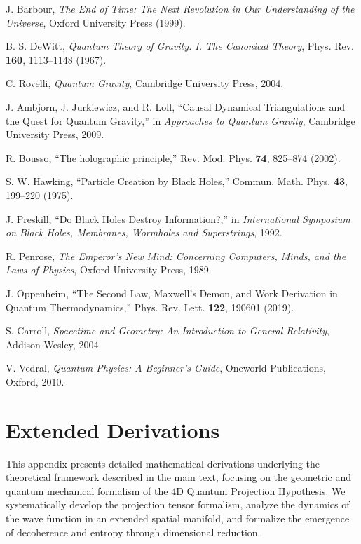 \documentclass[12pt,a4paper]{article}
\numberwithin{equation}{section}
\begin{document}
\begin{thebibliography}{99}
J. Barbour, \emph{The End of Time: The Next Revolution in Our Understanding of the Universe}, Oxford University Press (1999).

B. S. DeWitt, \emph{Quantum Theory of Gravity. I. The Canonical Theory}, Phys. Rev. \textbf{160}, 1113--1148 (1967).

C. Rovelli, \emph{Quantum Gravity}, Cambridge University Press, 2004.

J. Ambjorn, J. Jurkiewicz, and R. Loll, “Causal Dynamical Triangulations and the Quest for Quantum Gravity,” in \emph{Approaches to Quantum Gravity}, Cambridge University Press, 2009.

R. Bousso, “The holographic principle,” Rev. Mod. Phys. \textbf{74}, 825–874 (2002).

S. W. Hawking, “Particle Creation by Black Holes,” Commun. Math. Phys. \textbf{43}, 199–220 (1975).

J. Preskill, “Do Black Holes Destroy Information?,” in \emph{International Symposium on Black Holes, Membranes, Wormholes and Superstrings}, 1992.

R. Penrose, \emph{The Emperor's New Mind: Concerning Computers, Minds, and the Laws of Physics}, Oxford University Press, 1989.

J. Oppenheim, “The Second Law, Maxwell’s Demon, and Work Derivation in Quantum Thermodynamics,” Phys. Rev. Lett. \textbf{122}, 190601 (2019).

S. Carroll, \emph{Spacetime and Geometry: An Introduction to General Relativity}, Addison-Wesley, 2004.

V. Vedral, \emph{Quantum Physics: A Beginner's Guide}, Oneworld Publications, Oxford, 2010.


\end{thebibliography}
\newpage
\appendix
\section{Extended Derivations}
\label{app:extended_derivations}

This appendix presents detailed mathematical derivations underlying the theoretical framework described in the main text, focusing on the geometric and quantum mechanical formalism of the 4D Quantum Projection Hypothesis. We systematically develop the projection tensor formalism, analyze the dynamics of the wave function in an extended spatial manifold, and formalize the emergence of decoherence and entropy through dimensional reduction.
\end{document}
